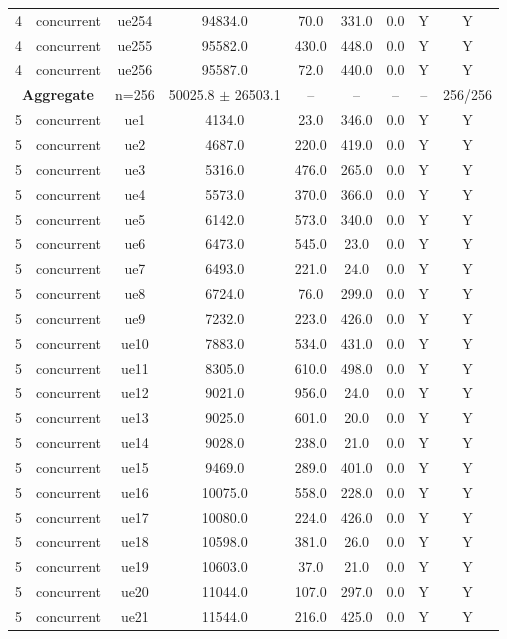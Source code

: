 \begin{table}[ht]
\begin{tabular}{|c|c|c|c|c|c|c|c|c|}
4 & concurrent & ue254 & 94834.0 & 70.0 & 331.0 & 0.0 & Y & Y \\
4 & concurrent & ue255 & 95582.0 & 430.0 & 448.0 & 0.0 & Y & Y \\
4 & concurrent & ue256 & 95587.0 & 72.0 & 440.0 & 0.0 & Y & Y \\
\multicolumn{2}{|c|}{\textbf{Aggregate}} & n=256 & 50025.8 $\pm$ 26503.1 & -- & -- & -- & -- & 256/256 \\
\hline
5 & concurrent & ue1 & 4134.0 & 23.0 & 346.0 & 0.0 & Y & Y \\
5 & concurrent & ue2 & 4687.0 & 220.0 & 419.0 & 0.0 & Y & Y \\
5 & concurrent & ue3 & 5316.0 & 476.0 & 265.0 & 0.0 & Y & Y \\
5 & concurrent & ue4 & 5573.0 & 370.0 & 366.0 & 0.0 & Y & Y \\
5 & concurrent & ue5 & 6142.0 & 573.0 & 340.0 & 0.0 & Y & Y \\
5 & concurrent & ue6 & 6473.0 & 545.0 & 23.0 & 0.0 & Y & Y \\
5 & concurrent & ue7 & 6493.0 & 221.0 & 24.0 & 0.0 & Y & Y \\
5 & concurrent & ue8 & 6724.0 & 76.0 & 299.0 & 0.0 & Y & Y \\
5 & concurrent & ue9 & 7232.0 & 223.0 & 426.0 & 0.0 & Y & Y \\
5 & concurrent & ue10 & 7883.0 & 534.0 & 431.0 & 0.0 & Y & Y \\
5 & concurrent & ue11 & 8305.0 & 610.0 & 498.0 & 0.0 & Y & Y \\
5 & concurrent & ue12 & 9021.0 & 956.0 & 24.0 & 0.0 & Y & Y \\
5 & concurrent & ue13 & 9025.0 & 601.0 & 20.0 & 0.0 & Y & Y \\
5 & concurrent & ue14 & 9028.0 & 238.0 & 21.0 & 0.0 & Y & Y \\
5 & concurrent & ue15 & 9469.0 & 289.0 & 401.0 & 0.0 & Y & Y \\
5 & concurrent & ue16 & 10075.0 & 558.0 & 228.0 & 0.0 & Y & Y \\
5 & concurrent & ue17 & 10080.0 & 224.0 & 426.0 & 0.0 & Y & Y \\
5 & concurrent & ue18 & 10598.0 & 381.0 & 26.0 & 0.0 & Y & Y \\
5 & concurrent & ue19 & 10603.0 & 37.0 & 21.0 & 0.0 & Y & Y \\
5 & concurrent & ue20 & 11044.0 & 107.0 & 297.0 & 0.0 & Y & Y \\
5 & concurrent & ue21 & 11544.0 & 216.0 & 425.0 & 0.0 & Y & Y \\

\end{tabular}
\end{table}
